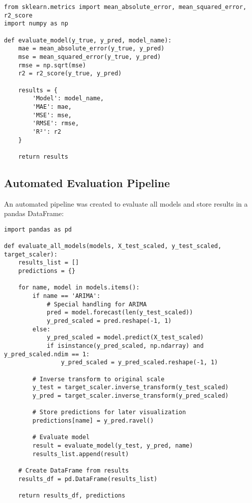 \documentclass[12pt]{article}
\begin{document}
\begin{verbatim}
from sklearn.metrics import mean_absolute_error, mean_squared_error, r2_score
import numpy as np

def evaluate_model(y_true, y_pred, model_name):
    mae = mean_absolute_error(y_true, y_pred)
    mse = mean_squared_error(y_true, y_pred)
    rmse = np.sqrt(mse)
    r2 = r2_score(y_true, y_pred)
    
    results = {
        'Model': model_name,
        'MAE': mae,
        'MSE': mse,
        'RMSE': rmse,
        'R²': r2
    }
    
    return results
\end{verbatim}

\subsection{Automated Evaluation Pipeline}
\label{subsec:evaluation_pipeline}

An automated pipeline was created to evaluate all models and store results in a pandas DataFrame:

\begin{verbatim}
import pandas as pd

def evaluate_all_models(models, X_test_scaled, y_test_scaled, target_scaler):
    results_list = []
    predictions = {}
    
    for name, model in models.items():
        if name == 'ARIMA':
            # Special handling for ARIMA
            pred = model.forecast(len(y_test_scaled))
            y_pred_scaled = pred.reshape(-1, 1)
        else:
            y_pred_scaled = model.predict(X_test_scaled)
            if isinstance(y_pred_scaled, np.ndarray) and y_pred_scaled.ndim == 1:
                y_pred_scaled = y_pred_scaled.reshape(-1, 1)
        
        # Inverse transform to original scale
        y_test = target_scaler.inverse_transform(y_test_scaled)
        y_pred = target_scaler.inverse_transform(y_pred_scaled)
        
        # Store predictions for later visualization
        predictions[name] = y_pred.ravel()
        
        # Evaluate model
        result = evaluate_model(y_test, y_pred, name)
        results_list.append(result)
    
    # Create DataFrame from results
    results_df = pd.DataFrame(results_list)
    
    return results_df, predictions
\end{verbatim}
\end{document}
